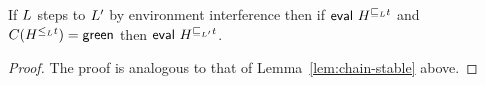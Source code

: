 
\begin{lemma}%
\label{lem:eval-stable}%
If $L$ steps to $L'$ by environment interference then
if $\mathsf{eval}\ \chainjleq{t}{\ordlist}$ and
$C(H^{\hbox{}\leq_{L} {t}}) = {\sf green}$ then
$\mathsf{eval}\ \chainjleq{t}{\ordlist'}$.
\end{lemma}

\begin{proof}
The proof is analogous to that of Lemma~\ref{lem:chain-stable} above.
\end{proof}


\begin{comment}
To sum up, we revisit Theorem~\ref{thm:specs} from
Section~\ref{sc:proof}. As for the {\tt write } method, we have
mechanized its proof of correctness in FCSL:
%
\begin{theorem}[{\tt write}]\label{thm:write}
The implementation for the {\tt write} method in
Figure~\ref{fig:fcsl-snapshot} can be ascribed the specification given
in Figure~\ref{fig:specs}.
\end{theorem}
%
As for scan, we haven't finished all the details of the mechanization,
but we present instead \gad{blah...}

\begin{lemma}[{\sf all green} {\tt scan}]\label{lem:green-scan}
After the execution of {\tt scan}, given $t_x$ and $t_y$, the
timestamps of the resulting snapshot $(r_X,r_y)$. If $t =
\mathsf{max}_{\tle} (t_X,t_y)$ then $ \C(\chaintleq{t}{\ordlist}$.
\end{lemma}
\begin{proof}
The proof unfolds as follows,
\end{proof}

\begin{theorem}[{\tt scan}]\label{thm:scan}
The implementation for the {\tt write} method in
Figure~\ref{fig:fcsl-snapshot} can be ascribed the specification given
in Figure~\ref{fig:specs}.
\end{theorem}

\end{comment}



